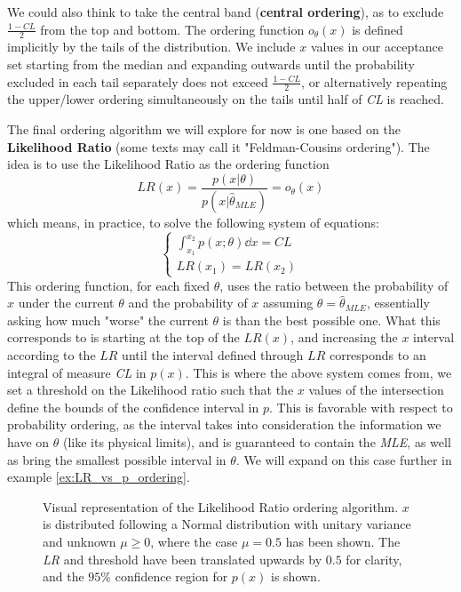 We could also think to take the central band (\textbf{central ordering}), as to exclude $\frac{1-CL}{2}$ from the top and bottom. The ordering function $o_{\theta}(x)$ is defined implicitly by the tails of the distribution. We include $x$ values in our acceptance set starting from the median and expanding outwards until the probability excluded in each tail separately does not exceed $\frac{1-CL}{2}$, or alternatively repeating the upper/lower ordering simultaneously on the tails until half of \emph{CL} is reached. 

The final ordering algorithm we will explore for now is one based on the \textbf{Likelihood Ratio} (some texts may call it "Feldman-Cousins ordering"). The idea is to use the Likelihood Ratio as the ordering function
	\[
	LR(x) = \frac{p(x|\theta)}{p(x|\hat{\theta}_{MLE})} = o_{\theta}(x)
	\]
which means, in practice, to solve the following system of equations:
	\[
	\begin{cases}
		\int_{x_1}^{x_2} p(x;\theta)\dd x = CL \\
		LR(x_1) = LR(x_2)
	\end{cases}
	\]
This ordering function, for each fixed $\theta$, uses the ratio between the probability of $x$ under the current $\theta$ and the probability of $x$ assuming $\theta=\hat{\theta}_{MLE}$, essentially asking how much "worse" the current $\theta$ is than the best possible one. What this corresponds to is starting at the top of the $LR(x)$, and increasing the $x$ interval according to the $LR$ until the interval defined through $LR$ corresponds to an integral of measure \emph{CL} in $p(x)$. This is where the above system comes from, we set a threshold on the Likelihood ratio such that the $x$ values of the intersection define the bounds of the confidence interval in $p$. This is favorable with respect to probability ordering, as the interval takes into consideration the information we have on $\theta$ (like its physical limits), and is guaranteed to contain the \emph{MLE}, as well as bring the smallest possible interval in $\theta$. We will expand on this case further in example \ref{ex:LR_vs_p_ordering}. 

\begin{figure}[H]
	\centering
	
	\caption{Visual representation of the Likelihood Ratio ordering algorithm. $x$ is distributed following a Normal distribution with unitary variance and unknown $\mu\geq 0$, where the case $\mu=0.5$ has been shown. The \emph{LR} and threshold have been translated upwards by $0.5$ for clarity, and the $95\%$ confidence region for $p(x)$ is shown.}
	\label{fig:lr_ordering}
\end{figure}

